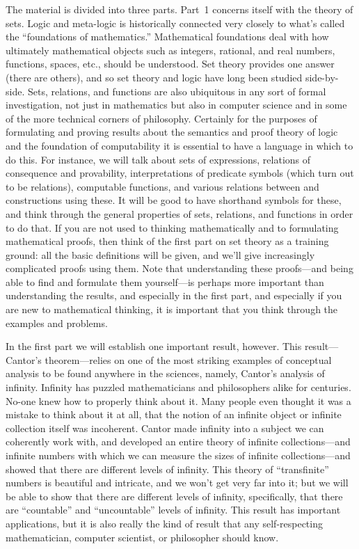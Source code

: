 The material is divided into three parts. Part~1 concerns
itself with the theory of sets. Logic and meta-logic is historically
connected very closely to what's called the ``foundations of
mathematics.''  Mathematical foundations deal with how ultimately
mathematical objects such as integers, rational, and real numbers,
functions, spaces, etc., should be understood. Set theory provides
one answer (there are others), and so set theory and logic have long
been studied side-by-side. Sets, relations, and functions are also
ubiquitous in any sort of formal investigation, not just in
mathematics but also in computer science and in some of the more
technical corners of philosophy. Certainly for the purposes of
formulating and proving results about the semantics and proof theory
of logic and the foundation of computability it is essential to have a
language in which to do this. For instance, we will talk about sets
of expressions, relations of consequence and provability,
interpretations of predicate symbols (which turn out to be relations),
computable functions, and various relations between and constructions
using these. It will be good to have shorthand symbols for
these, and think through the general properties of sets, relations,
and functions in order to do that. If you are not used to thinking
mathematically and to formulating mathematical proofs, then think of
the first part on set theory as a training ground: all the basic
definitions will be given, and we'll give increasingly complicated
proofs using them. Note that understanding these proofs---and being
able to find and formulate them yourself---is perhaps more important
than understanding the results, and especially in the first part, and
especially if you are new to mathematical thinking, it is important
that you think through the examples and problems.

In the first part we will establish one important result, however.
This result---Cantor's theorem---relies on one of the most striking
examples of conceptual analysis to be found anywhere in the sciences,
namely, Cantor's analysis of infinity. Infinity has puzzled
mathematicians and philosophers alike for centuries. No-one knew how
to properly think about it. Many people even thought it was a mistake
to think about it at all, that the notion of an infinite object or
infinite collection itself was incoherent. Cantor made infinity into
a subject we can coherently work with, and developed an entire theory
of infinite collections---and infinite numbers with which we can
measure the sizes of infinite collections---and showed that there are
different levels of infinity. This theory of ``transfinite'' numbers
is beautiful and intricate, and we won't get very far into it; but we
will be able to show that there are different levels of infinity,
specifically, that there are ``countable'' and ``uncountable'' levels
of infinity. This result has important applications, but it is
also really the kind of result that any self-respecting mathematician,
computer scientist, or philosopher should know.

